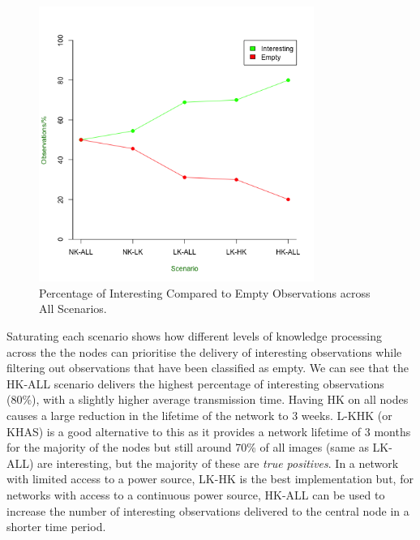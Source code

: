 	\begin{figure}[h]
	\centering
	\includegraphics[width=0.8\textwidth]{Chap7/figures/saturated/int_vs_empty}
	\caption{Percentage of Interesting Compared to Empty Observations across All Scenarios.}
	\label{fig:sat:int:empty}
	\end{figure}

Saturating each scenario shows how different levels of knowledge processing across the the nodes can prioritise the delivery of interesting observations while filtering out observations that have been classified as empty. We can see that the HK-ALL scenario delivers the highest percentage of interesting observations (80\%), with a slightly higher average transmission time. Having HK on all nodes causes a large reduction in the lifetime of the network to 3 weeks. L-KHK (or KHAS) is a good alternative to this as it provides a network lifetime of 3 months for the majority of the nodes but still around 70\% of all images (same as LK-ALL) are interesting, but the majority of these are \textit{true positives}. In a network with limited access to a power source, LK-HK is the best implementation but, for networks with access to a continuous power source, HK-ALL can be used to increase the number of interesting observations delivered to the central node in a shorter time period.


